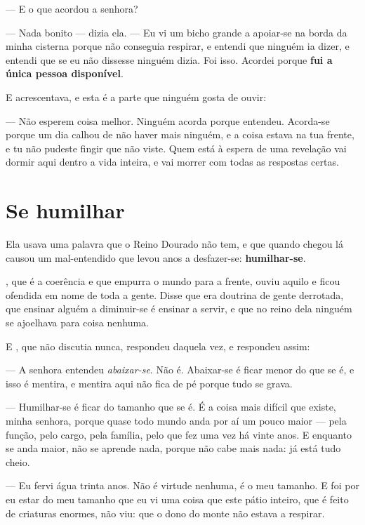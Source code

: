 \documentclass[livro.tex]{subfiles}
\begin{document}
--- E o que acordou a senhora?

--- Nada bonito --- dizia ela. --- Eu vi um bicho grande a apoiar-se na borda da minha cisterna
porque não conseguia respirar, e entendi que ninguém ia dizer, e entendi que se eu não dissesse
ninguém dizia. Foi isso. Acordei porque \textbf{fui a única pessoa disponível}.

\medskip

E acrescentava, e esta é a parte que ninguém gosta de ouvir:

--- Não esperem coisa melhor. Ninguém acorda porque entendeu. Acorda-se porque um dia calhou de
não haver mais ninguém, e a coisa estava na tua frente, e tu não pudeste fingir que não viste.
Quem está à espera de uma revelação vai dormir aqui dentro a vida inteira, e vai morrer com todas
as respostas certas.

\section{Se humilhar}

Ela usava uma palavra que o Reino Dourado não tem, e que quando chegou lá causou um mal-entendido
que levou anos a desfazer-se: \textbf{humilhar-se}.

\Yas , que é a coerência e que empurra o mundo para a frente, ouviu aquilo e ficou ofendida em
nome de toda a gente. Disse que era doutrina de gente derrotada, que ensinar alguém a diminuir-se
é ensinar a servir, e que no reino dela ninguém se ajoelhava para coisa nenhuma.

E \Lua , que não discutia nunca, respondeu daquela vez, e respondeu assim:

\medskip

--- A senhora entendeu \emph{abaixar-se}. Não é. Abaixar-se é ficar menor do que se é, e isso é
mentira, e mentira aqui não fica de pé porque tudo se grava.

--- Humilhar-se é ficar do tamanho que se é. É a coisa mais difícil que existe, minha senhora,
porque quase todo mundo anda por aí um pouco maior --- pela função, pelo cargo, pela família,
pelo que fez uma vez há vinte anos. E enquanto se anda maior, não se aprende nada, porque não
cabe mais nada: já está tudo cheio.

--- Eu fervi água trinta anos. Não é virtude nenhuma, é o meu tamanho. E foi por eu estar do meu
tamanho que eu vi uma coisa que este pátio inteiro, que é feito de criaturas enormes, não viu:
que o dono do monte não estava a respirar.
\end{document}
